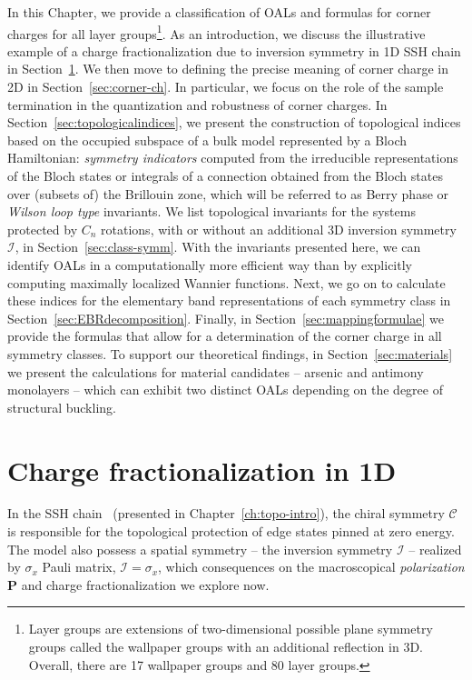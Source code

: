 In this Chapter, we provide a classification of OALs and formulas for corner charges for all layer groups\footnote{Layer groups are extensions of two-dimensional possible plane symmetry groups called the wallpaper groups with an additional reflection in 3D. Overall, there are 17 wallpaper groups and 80 layer groups.}. As an introduction, we discuss the illustrative example of a charge fractionalization due to inversion symmetry in 1D SSH chain in Section~\ref{sec:ssh-frac}. We then move to defining the precise meaning of corner charge in 2D in Section~\ref{sec:corner-ch}. In particular, we focus on the role of the sample termination in the quantization and robustness of corner charges. In Section~\ref{sec:topologicalindices}, we present the construction of topological indices based on the occupied subspace of a bulk model represented by a Bloch Hamiltonian: \emph{symmetry indicators} computed from the irreducible representations of the Bloch states or integrals of a connection obtained from the Bloch states over (subsets of) the Brillouin zone, which will be referred to as Berry phase or \emph{Wilson loop type} invariants. We list topological invariants for the systems protected by $C_n$ rotations, with or without an additional 3D inversion symmetry $\mathcal{I}$, in Section~\ref{sec:class-symm}. With the invariants presented here, we can identify OALs in a computationally more efficient way than by explicitly computing maximally localized Wannier functions. Next, we go on to calculate these indices for the elementary band representations of each symmetry class in Section~\ref{sec:EBRdecomposition}. Finally, in Section~\ref{sec:mappingformulae} we provide the formulas that allow for a determination of the corner charge in all symmetry classes. To support our theoretical findings, in Section~\ref{sec:materials} we present the calculations for material candidates -- arsenic and antimony monolayers -- which can exhibit two distinct OALs depending on the degree of structural buckling.
 
\section{Charge fractionalization in 1D}
\label{sec:ssh-frac}
In the SSH chain~\cite{SSH1976} (presented in Chapter~\ref{ch:topo-intro}), the chiral symmetry $\mathcal{C}$ is responsible for the topological protection of edge states pinned at zero energy. The model also possess a spatial symmetry -- the inversion symmetry $\mathcal{I}$ -- realized by $\sigma_x$ Pauli matrix, $\mathcal{I} = \sigma_x$, which consequences on the macroscopical \emph{polarization} $\mathbf{P}$ and charge fractionalization we explore now. 

